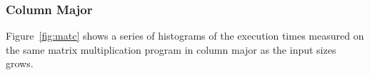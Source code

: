 \documentclass[10pt]{article}
\begin{document}
\pagebreak

\subsubsection{Column Major}

Figure~\ref{fig:matc} shows a series of 
histograms of the execution times measured on 
the same matrix multiplication program in column major 
as the input sizes grows. 

\begin{figure}[h]
	\centering
\end{figure}
\end{document}
